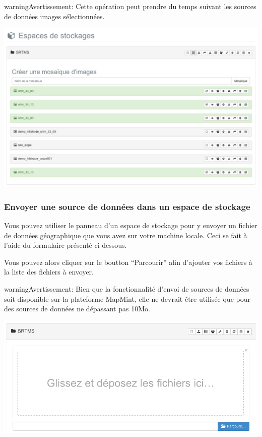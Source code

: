 \documentclass[letterpaper,10pt,french]{sphinxmanual}
\begin{document}
\begin{notice}{warning}{Avertissement:}
Cette opération peut prendre du temps suivant les sources de
données images sélectionnées.
\end{notice}

\includegraphics[width=1.000\linewidth]{data-store-mozaic.png}


\subsubsection{Envoyer une source de données dans un espace de stockage}
\label{data/datastores:envoyer-une-source-de-donnees-dans-un-espace-de-stockage}
Vous pouvez utiliser le panneau d'un espace de stockage pour y envoyer
un fichier de données géographique que vous avez sur votre machine
locale. Ceci se fait à l'aide du formulaire présenté ci-dessous.

Vous pouvez alors cliquer sur le boutton ``Parcourir'' afin d'ajouter
vos fichiers à la liste des fichiers à envoyer.

\begin{notice}{warning}{Avertissement:}
Bien que la fonctionnalité d'envoi de sources de données soit
disponible sur la plateforme MapMint, elle ne devrait être
utilisée que pour des sources de données ne dépassant pas 10Mo.
\end{notice}

\includegraphics[width=1.000\linewidth]{data-store-upload.png}
\end{document}
